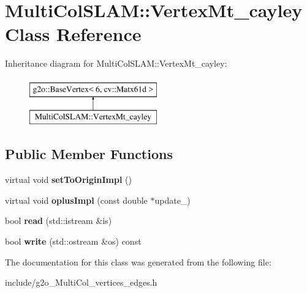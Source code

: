 \hypertarget{classMultiColSLAM_1_1VertexMt__cayley}{}\section{Multi\+Col\+S\+L\+AM\+:\+:Vertex\+Mt\+\_\+cayley Class Reference}
\label{classMultiColSLAM_1_1VertexMt__cayley}
Inheritance diagram for Multi\+Col\+S\+L\+AM\+:\+:Vertex\+Mt\+\_\+cayley\+:\begin{figure}[H]
\begin{center}
\leavevmode
\includegraphics[height=2.000000cm]{classMultiColSLAM_1_1VertexMt__cayley}
\end{center}
\end{figure}
\subsection*{Public Member Functions}
\begin{DoxyCompactItemize}
\item 
virtual void {\bfseries set\+To\+Origin\+Impl} ()\hypertarget{classMultiColSLAM_1_1VertexMt__cayley_adfc6b70e21a0022fd4f76f2c4099bfd3}{}\label{classMultiColSLAM_1_1VertexMt__cayley_adfc6b70e21a0022fd4f76f2c4099bfd3}

\item 
virtual void {\bfseries oplus\+Impl} (const double $\ast$update\+\_\+)\hypertarget{classMultiColSLAM_1_1VertexMt__cayley_ad08baaa001240d2725c61463b185143f}{}\label{classMultiColSLAM_1_1VertexMt__cayley_ad08baaa001240d2725c61463b185143f}

\item 
bool {\bfseries read} (std\+::istream \&is)\hypertarget{classMultiColSLAM_1_1VertexMt__cayley_a9c30f22a6ed3382a46ea539aabd12cc8}{}\label{classMultiColSLAM_1_1VertexMt__cayley_a9c30f22a6ed3382a46ea539aabd12cc8}

\item 
bool {\bfseries write} (std\+::ostream \&os) const \hypertarget{classMultiColSLAM_1_1VertexMt__cayley_a68cf1a02055373cf62d42304b70e8acb}{}\label{classMultiColSLAM_1_1VertexMt__cayley_a68cf1a02055373cf62d42304b70e8acb}

\end{DoxyCompactItemize}


The documentation for this class was generated from the following file\+:\begin{DoxyCompactItemize}
\item 
include/g2o\+\_\+\+Multi\+Col\+\_\+vertices\+\_\+edges.\+h\end{DoxyCompactItemize}
